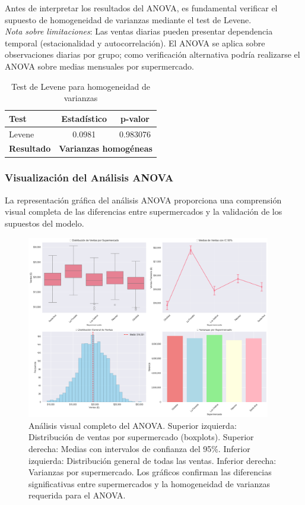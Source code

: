 \documentclass[11pt,a4paper]{article}
\begin{document}
Antes de interpretar los resultados del ANOVA, es fundamental verificar el supuesto de homogeneidad de varianzas mediante el test de Levene.
\\
\textit{Nota sobre limitaciones}: Las ventas diarias pueden presentar dependencia temporal (estacionalidad y autocorrelación). El ANOVA se aplica sobre observaciones diarias por grupo; como verificación alternativa podría realizarse el ANOVA sobre medias mensuales por supermercado.

\begin{table}[H]
\centering
\caption{Test de Levene para homogeneidad de varianzas}
\begin{tabular}{|l|c|c|}
\hline
\textbf{Test} & \textbf{Estadístico} & \textbf{p-valor} \\
\hline
Levene & 0.0981 & 0.983076 \\
\hline
\textbf{Resultado} & \multicolumn{2}{c|}{\textbf{Varianzas homogéneas}} \\
\hline
\end{tabular}
\end{table}

\subsubsection{Visualización del Análisis ANOVA}

La representación gráfica del análisis ANOVA proporciona una comprensión visual completa de las diferencias entre supermercados y la validación de los supuestos del modelo.

\begin{figure}[H]
\centering
\includegraphics[width=0.95\textwidth]{../data/output2.png}
\caption{Análisis visual completo del ANOVA. Superior izquierda: Distribución de ventas por supermercado (boxplots). Superior derecha: Medias con intervalos de confianza del 95\%. Inferior izquierda: Distribución general de todas las ventas. Inferior derecha: Varianzas por supermercado. Los gráficos confirman las diferencias significativas entre supermercados y la homogeneidad de varianzas requerida para el ANOVA.}
\label{fig:anova_analisis}
\end{figure}
\end{document}
